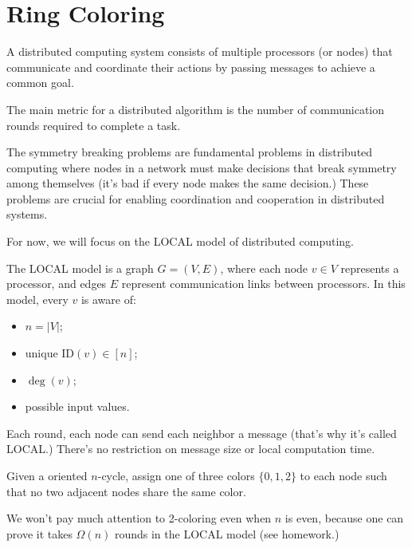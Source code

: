 \chapter{Ring Coloring} \label{chap:ring-coloring}

\begin{definition}
	A distributed computing system consists of multiple processors (or nodes) that communicate and coordinate their actions by passing messages to achieve a common goal.

	The main metric for a distributed algorithm is the number of communication rounds required to complete a task.
\end{definition}

The symmetry breaking problems are fundamental problems in distributed computing where nodes in a network must make decisions that break symmetry among themselves (it's bad if every node makes the same decision.) These problems are crucial for enabling coordination and cooperation in distributed systems.

For now, we will focus on the LOCAL model of distributed computing.

\begin{definition}
	The LOCAL model is a graph $G=(V,E)$, where each node $v \in V$ represents a processor, and edges $E$ represent communication links between processors. In this model, every $v$ is aware of:
	\begin{itemize}
		\item $n = |V|$;
		\item unique $\text{ID}(v) \in [n]$;
		\item $\deg(v)$;
		\item possible input values.
	\end{itemize}
	Each round, each node can send each neighbor a message (that's why it's called LOCAL.) There's no restriction on message size or local computation time.
\end{definition}


\begin{problem}
Given a oriented $n$-cycle, assign one of three colors $\{0,1,2\}$ to each node such that no two adjacent nodes share the same color.
\end{problem}

\begin{remark}
	We won't pay much attention to 2-coloring even when $n$ is even, because one can prove it takes $\Omega(n)$ rounds in the LOCAL model (see homework.)
\end{remark}

